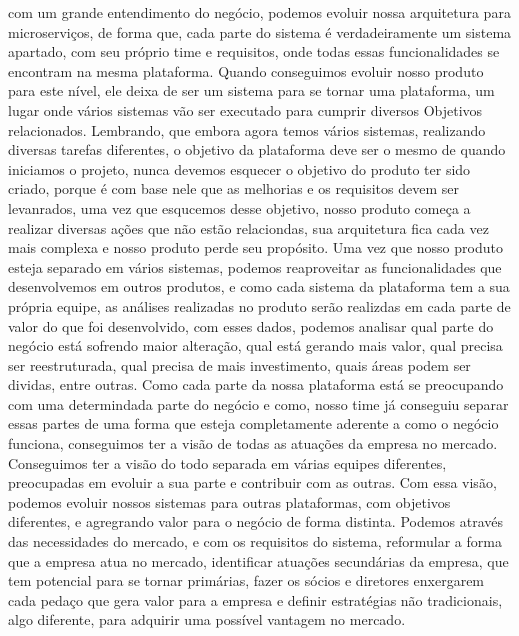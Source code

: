     com um grande entendimento do negócio, podemos evoluir nossa arquitetura para
    microserviços, de forma que, cada parte do sistema é verdadeiramente um sistema
    apartado, com seu próprio time e requisitos, onde todas essas funcionalidades
    se encontram na mesma plataforma. Quando conseguimos evoluir nosso produto
    para este nível, ele deixa de ser um sistema para se tornar uma plataforma,
    um lugar onde vários sistemas vão ser executado para cumprir diversos Objetivos
    relacionados. Lembrando, que embora agora temos vários sistemas, realizando
    diversas tarefas diferentes, o objetivo da plataforma deve ser o mesmo de
    quando iniciamos o projeto, nunca devemos esquecer o objetivo do produto ter
    sido criado, porque é com base nele que as melhorias e os requisitos devem ser
    levanrados, uma vez que esqucemos desse objetivo, nosso produto começa a
    realizar diversas ações que não estão relaciondas, sua arquitetura fica cada
    vez mais complexa e nosso produto perde seu propósito. \newline
    Uma vez que nosso produto esteja separado em vários sistemas, podemos reaproveitar
    as funcionalidades que desenvolvemos em outros produtos, e como cada sistema
    da plataforma tem a sua própria equipe, as análises realizadas no produto
    serão realizdas em cada parte de valor do que foi desenvolvido, com esses
    dados, podemos analisar qual parte do negócio está sofrendo maior alteração,
    qual está gerando mais valor, qual precisa ser reestruturada, qual precisa
    de mais investimento, quais áreas podem ser dividas, entre outras. Como
    cada parte da nossa plataforma está se preocupando com uma determindada parte
    do negócio e como, nosso time já conseguiu separar essas partes de uma forma
    que esteja completamente aderente a como o negócio funciona, conseguimos ter
    a visão de todas as atuações da empresa no mercado. Conseguimos ter a visão
    do todo separada em várias equipes diferentes, preocupadas em evoluir a sua
    parte e contribuir com as outras. Com essa visão, podemos evoluir nossos
    sistemas para outras plataformas, com objetivos diferentes, e agregrando
    valor para o negócio de forma distinta. Podemos através das necessidades do
    mercado, e com os requisitos do sistema, reformular a forma que a empresa
    atua no mercado, identificar atuações secundárias da empresa, que tem potencial
    para se tornar primárias, fazer os sócios e diretores enxergarem cada pedaço
    que gera valor para a empresa e definir estratégias não tradicionais, algo
    diferente, para adquirir uma possível vantagem no mercado.

